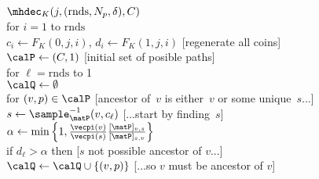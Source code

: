 \begin{figure}
\center
{} 
{
\underline{$\mhdec_K(j,(\mathrm{rnds},N_p,\delta),C)$}\\[2pt]
for $i=1$ to $\mathrm{rnds}$\\
\nudge $c_i \gets F_K(0,j,i)$, $d_i \gets F_K(1,j,i)$ \hfill{\tiny [regenerate all coins]}\\
$\calP \gets (C,1)$ \hfill{\tiny [initial set of posible paths]}\\
for $\ell=\mathrm{rnds}$ to 1\\
\nudge $\calQ \gets \emptyset$\\
\nudge for $(v,p) \in \calP$ \hfill{\tiny[ancestor of~$v$ is either~$v$ or some unique~$s$...]}\\
\nnudge $s \gets \sample_{\matP}^{-1}(v,c_\ell)$ \hfill{\tiny[...start by finding~$s$]}\\
\nnudge $\alpha \gets
\min\left\{1,\frac{\vecpi(v)}{\vecpi(s)}\frac{[\matP]_{v,s}}{[\matP]_{s,v}}
\right\}$\\
\nnudge if $d_\ell > \alpha$ then \hfill{\tiny [$s$ not possible ancestor of $v$...]}\\
\nnudge\nudge $\calQ \gets \calQ \cup \{(v,p)\}$ \hfill{\tiny [...so $v$ must be ancestor of $v$]}\\
}
\end{figure}
